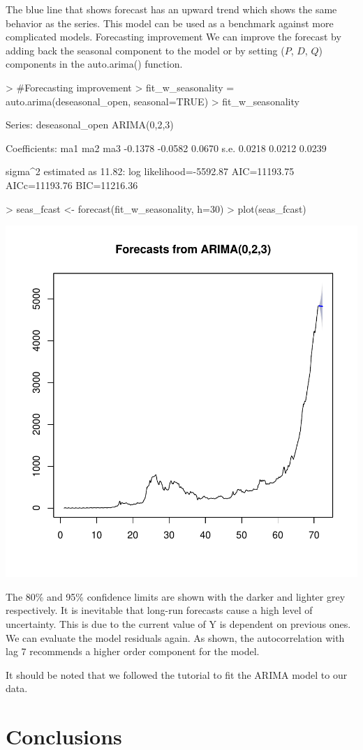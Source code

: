 \documentclass{article}
\begin{document}
The blue line that shows forecast has an upward trend which shows the same behavior as the series. This model can be used as a benchmark against more complicated models.
Forecasting improvement  
We can improve the forecast by adding back the seasonal component to the model or by setting ($P$, $D$, $Q$) components in the auto.arima() function. 
\begin{Schunk}
\begin{Sinput}
> #Forecasting improvement
>  fit_w_seasonality = auto.arima(deseasonal_open, seasonal=TRUE)
>  fit_w_seasonality
\end{Sinput}
\begin{Soutput}
Series: deseasonal_open 
ARIMA(0,2,3) 

Coefficients:
          ma1      ma2     ma3
      -0.1378  -0.0582  0.0670
s.e.   0.0218   0.0212  0.0239

sigma^2 estimated as 11.82:  log likelihood=-5592.87
AIC=11193.75   AICc=11193.76   BIC=11216.36
\end{Soutput}
\begin{Sinput}
>  seas_fcast <- forecast(fit_w_seasonality, h=30)
>  plot(seas_fcast)
\end{Sinput}
\end{Schunk}
\includegraphics{Report-022}

The 80\% and 95\% confidence limits are shown with the darker and lighter grey respectively. It is inevitable that long-run forecasts cause a high level of uncertainty. This is due to the current value of Y is dependent on previous ones.
We can evaluate the model residuals again. As shown, the autocorrelation with lag 7 recommends a higher order component for the model.

It should be noted that we followed the tutorial to fit the ARIMA model to our data. 

\section{Conclusions}
\end{document}
